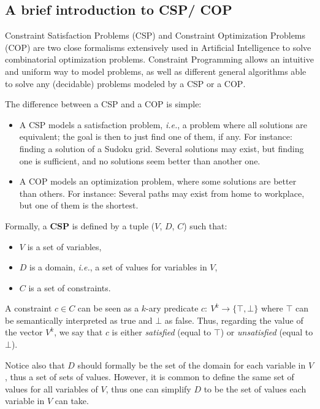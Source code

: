 \documentclass[journal]{IEEEtran}
\newcommand{\minormod}[1]{\color{red} #1\color{black} \xspace}
\newcommand{\csp}{\textsc{CSP}\xspace}
\newcommand{\cop}{\textsc{COP}\xspace}
\newcommand{\ie}{\textit{i.e.}}
\begin{document}

\subsection{A brief introduction to \csp / \cop}

Constraint  Satisfaction Problems  (\csp) and  Constraint Optimization
Problems  (\cop)   are  two  close  formalisms   extensively  used  in
Artificial  Intelligence  to   solve  combinatorial    optimization
problems. Constraint  Programming allows an intuitive  and uniform way
to model  problems, as  well as different  general algorithms able to
solve any \minormod{(decidable)} problems modeled by a \csp or a \cop.

The difference between a \csp and a \cop is simple:
\begin{itemize}
\item A \csp  models a satisfaction problem, \ie, a  problem where all
  solutions are equivalent; the goal is then to just find one of them,
  if any. For  instance: finding a solution of a  Sudoku grid. Several
  solutions may exist, but finding one is sufficient, and no solutions
  seem better than another one.
\item A \cop models an  optimization problem, where some solutions are
  better than others.  For instance: Several paths may exist from home
  to workplace, but one of them is the shortest.
\end{itemize}
Formally, a {\bf \csp} is defined by a tuple ($V$, $D$, $C$) such that:
\begin{itemize}
\item $V$ is a set of variables,
\item $D$ is a domain, \ie, a set of values for variables in $V$,
\item $C$ is a set of constraints.
\end{itemize}

A  constraint  $c   \in  C$  can  be  seen  as   a  $k$-ary  predicate
$c:~V^k\rightarrow\{\top,\bot\}$  where  $\top$  can  be  semantically
interpreted as true and $\bot$ as false. Thus, regarding the value of
the vector $V^k$, we say that $c$ is either {\it satisfied} (equal to
$\top$) or {\it unsatisfied} (equal to $\bot$).

Notice also that $D$ should formally be the set of the domain for each
variable in $V$, thus a set of  sets of values. However, it is common to
define the same set  of values for all variables of  $V$, thus one can
simplify $D$ to be the set of values each variable in $V$ can take.
\end{document}
